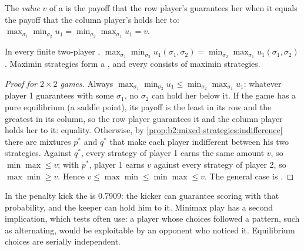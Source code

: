 \begin{definition}\label{def:b2:mixed-strategies:value}
The \emph{value} $v$ of a  is the payoff that the row player's
 guarantees her when it equals the payoff that the column player's  holds
her to: $\max_{\sigma_1}\min_{\sigma_2} u_1 = \min_{\sigma_2}\max_{\sigma_1} u_1 = v$.
\end{definition}

\begin{theorem}\label{thm:b2:mixed-strategies:minimax}
In every finite two-player , $\max_{\sigma_1}\min_{\sigma_2} u_1(\sigma_1, \sigma_2) =
\min_{\sigma_2}\max_{\sigma_1} u_1(\sigma_1, \sigma_2)$. Maximin strategies form a , and every
 consists of maximin strategies.
\end{theorem}

\begin{proof}[Proof for $2 \times 2$ games]
Always $\max_{\sigma_1}\min_{\sigma_2} u_1 \le \min_{\sigma_2}\max_{\sigma_1} u_1$: whatever player 1
guarantees with some $\sigma_1$, no $\sigma_2$ can hold her below it. If the game has a pure equilibrium (a saddle point), its payoff is the least in its row
and the greatest in its column, so the row player guarantees it and the column player holds her to it:
equality. Otherwise, by \cref{prop:b2:mixed-strategies:indifference} there are mixtures $p^*$ and $q^*$ that make
each player indifferent between his two strategies. Against $q^*$, every strategy of player 1 earns the same
amount $v$, so $\min\max \le v$; with $p^*$, player 1 earns $v$ against every strategy of player 2, so $\max\min \ge
v$. Hence $v \le \max\min \le \min\max \le v$. The general case is \admitted.
\end{proof}

In the penalty kick the  is 0.7909: the kicker can guarantee scoring with that probability, and the
keeper can hold him to it. Minimax play has a second implication, which tests often use: a player whose
choices followed a pattern, such as alternating, would be exploitable by an opponent who noticed it.
Equilibrium choices are serially independent.

